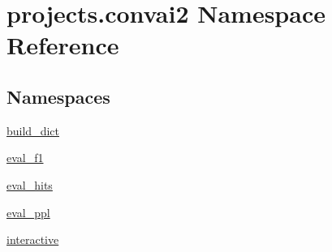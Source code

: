 \hypertarget{namespaceprojects_1_1convai2}{}\section{projects.\+convai2 Namespace Reference}
\label{namespaceprojects_1_1convai2}
\subsection*{Namespaces}
\begin{DoxyCompactItemize}
\item 
 \hyperlink{namespaceprojects_1_1convai2_1_1build__dict}{build\+\_\+dict}
\item 
 \hyperlink{namespaceprojects_1_1convai2_1_1eval__f1}{eval\+\_\+f1}
\item 
 \hyperlink{namespaceprojects_1_1convai2_1_1eval__hits}{eval\+\_\+hits}
\item 
 \hyperlink{namespaceprojects_1_1convai2_1_1eval__ppl}{eval\+\_\+ppl}
\item 
 \hyperlink{namespaceprojects_1_1convai2_1_1interactive}{interactive}
\end{DoxyCompactItemize}
